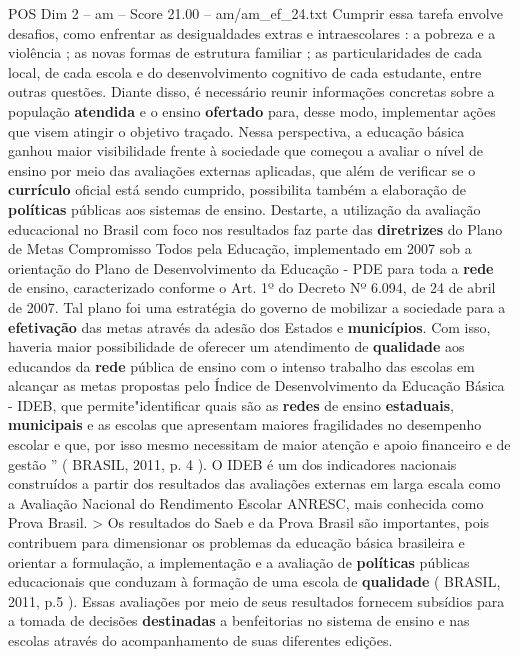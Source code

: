 \begin{textsample}{POS Dim 2 – am – Score 21.00 – am/am\_ef\_24.txt}
Cumprir essa tarefa envolve desafios, como enfrentar as desigualdades extras e intraescolares : a pobreza e a violência ; as novas formas de estrutura familiar ; as particularidades de cada local, de cada escola e do desenvolvimento cognitivo de cada estudante, entre outras questões.
Diante disso, é necessário reunir informações concretas sobre a população \textbf{atendida} e o ensino \textbf{ofertado} para, desse modo, implementar ações que visem atingir o objetivo traçado.
Nessa perspectiva, a educação básica ganhou maior visibilidade frente à sociedade que começou a avaliar o nível de ensino por meio das avaliações externas aplicadas, que além de verificar se o \textbf{currículo} oficial está sendo cumprido, possibilita também a elaboração de \textbf{políticas} públicas aos sistemas de ensino.
Destarte, a utilização da avaliação educacional no Brasil com foco nos resultados faz parte das \textbf{diretrizes} do Plano de Metas Compromisso Todos pela Educação, implementado em 2007 sob a orientação do Plano de Desenvolvimento da Educação - PDE para toda a \textbf{rede} de ensino, caracterizado conforme o Art. 1º do Decreto Nº 6.094, de 24 de abril de 2007.
Tal plano foi uma estratégia do governo de mobilizar a sociedade para a \textbf{efetivação} das metas através da adesão dos Estados e \textbf{municípios}.
Com isso, haveria maior possibilidade de oferecer um atendimento de \textbf{qualidade} aos educandos da \textbf{rede} pública de ensino com o intenso trabalho das escolas em alcançar as metas propostas pelo Índice de Desenvolvimento da Educação Básica - IDEB, que permite"identificar quais são as \textbf{redes} de ensino \textbf{estaduais}, \textbf{municipais} e as escolas que apresentam maiores fragilidades no desempenho escolar e que, por isso mesmo necessitam de maior atenção e apoio financeiro e de gestão ” ( BRASIL, 2011, p. 4 ).
O IDEB é um dos indicadores nacionais construídos a partir dos resultados das avaliações externas em larga escala como a Avaliação Nacional do Rendimento Escolar ANRESC, mais conhecida como Prova Brasil. > Os resultados do Saeb e da Prova Brasil são importantes, pois contribuem para dimensionar os problemas da educação básica brasileira e orientar a formulação, a implementação e a avaliação de \textbf{políticas} públicas educacionais que conduzam à formação de uma escola de \textbf{qualidade} ( BRASIL, 2011, p.5 ).
Essas avaliações por meio de seus resultados fornecem subsídios para a tomada de decisões \textbf{destinadas} a benfeitorias no sistema de ensino e nas escolas através do acompanhamento de suas diferentes edições.

\end{textsample}
